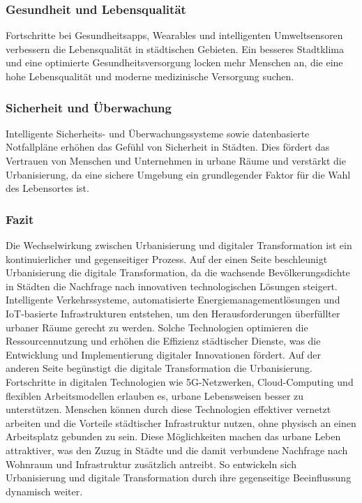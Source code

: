 \documentclass[conference,compsoc,final,a4paper, onecolumn, 11pt]{IEEEtran}
\begin{document}
\subsubsection{Gesundheit und Lebensqualität}
Fortschritte bei Gesundheitsapps, Wearables und intelligenten Umweltsensoren verbessern die Lebensqualität in städtischen Gebieten. 
Ein besseres Stadtklima und eine optimierte Gesundheitsversorgung locken mehr Menschen an, die eine hohe Lebensqualität und moderne medizinische Versorgung suchen\autocite{un_habitat_world_cities}.

\subsubsection{ Sicherheit und Überwachung}
Intelligente Sicherheits- und Überwachungssysteme sowie datenbasierte Notfallpläne erhöhen das Gefühl von Sicherheit in Städten. 
Dies fördert das Vertrauen von Menschen und Unternehmen in urbane Räume und verstärkt die Urbanisierung, da eine sichere Umgebung ein grundlegender Faktor für die Wahl des Lebensortes ist.\autocite{mckinsey_smart_cities}


\subsubsection{Fazit}
Die Wechselwirkung zwischen Urbanisierung und digitaler Transformation ist ein kontinuierlicher und gegenseitiger Prozess.
Auf der einen Seite beschleunigt Urbanisierung die digitale Transformation, da die wachsende Bevölkerungsdichte in Städten die Nachfrage nach innovativen technologischen Lösungen steigert. 
Intelligente Verkehrssysteme, automatisierte Energiemanagementlösungen und \ac{IoT}-basierte Infrastrukturen entstehen, um den Herausforderungen überfüllter urbaner Räume gerecht zu werden. 
Solche Technologien optimieren die Ressourcennutzung und erhöhen die Effizienz städtischer Dienste, was die Entwicklung und Implementierung digitaler Innovationen fördert.
Auf der anderen Seite begünstigt die digitale Transformation die Urbanisierung. 
Fortschritte in digitalen Technologien wie 5G-Netzwerken, Cloud-Computing und flexiblen Arbeitsmodellen erlauben es, urbane Lebensweisen besser zu unterstützen. 
Menschen können durch diese Technologien effektiver vernetzt arbeiten und die Vorteile städtischer Infrastruktur nutzen, ohne physisch an einen Arbeitsplatz gebunden zu sein. 
Diese Möglichkeiten machen das urbane Leben attraktiver, was den Zuzug in Städte und die damit verbundene Nachfrage nach Wohnraum und Infrastruktur zusätzlich antreibt.
So entwickeln sich Urbanisierung und digitale Transformation durch ihre gegenseitige Beeinflussung dynamisch weiter. 
\end{document}
